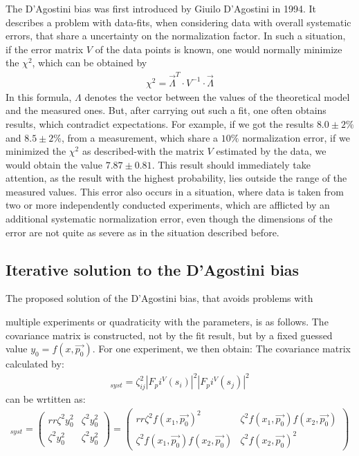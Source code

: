 \documentclass[a4paper]{article}
\begin{document}
The D'Agostini bias was first introduced by Giuilo D'Agostini in 1994. It
describes a problem with data-fits, when considering data with overall
systematic errors, that share a uncertainty on the normalization factor. In
such a situation, if the error matrix $V$ of the data points is known, one
would normally minimize the $\chi^2$, which can be obtained by
\begin{align}
\chi^2=\vec{\Lambda}^T\cdot V^{-1}\cdot\vec{\Lambda}
\end{align}
In this formula, $\Lambda$ denotes the vector between the values of the theoretical model and
the measured ones. But, after carrying out such a fit, one often obtains
results, which contradict expectations. For example, if we got the results
$8.0\pm 2\%$ and $8.5\pm 2\%$, from a measurement, which share a $10\%$
normalization error, if we minimized the $\chi^2$ as described-with the matrix
$V$ estimated by the data, we would obtain the value $7.87\pm 0.81$. This
result should immediately take attention, as the result with the highest
probability, lies outside the range of the measured values. This error also
occurs in a situation, where data is taken from two or more independently
conducted experiments, which are afflicted by an additional systematic
normalization error, even though the dimensions of the error are not quite as
severe as in the situation described before.

\subsection{Iterative solution to the D'Agostini bias}
The proposed solution of the D'Agostini bias, that avoids problems with

multiple experiments or quadraticity with the parameters, is as follows. The
covariance matrix is constructed, not by the fit result, but by a fixed guessed
value $y_0=f(x,\Vec{p_0})$. For one experiment, we then obtain: The covariance
matrix calculated by:
\begin{align}
    [Cov_{ij}]_{syst}=\zeta_{ij}^2|F_pi^V(s_i)|^2|F_pi^V(s_j)|^2
\end{align}
can be wrtitten as:
\begin{align}
    [Cov(y_i,y_j)]_{syst}=\begin{pmatrix}{rr}
    \zeta^2y_0^2 & \zeta^2y_0^2 \\
    \zeta^2y_0^2 & \zeta^2y_0^2
\end{pmatrix}=\begin{pmatrix}{rr}
  \zeta^2f(x_1,\Vec{p_0})^2   & \zeta^2f(x_1,\Vec{p_0})f(x_2,\Vec{p_0}) \\
  \zeta^2f(x_1,\Vec{p_0})f(x_2,\Vec{p_0})   & \zeta^2f(x_2,\Vec{p_0})^2
\end{pmatrix}
\end{align}
\end{document}
